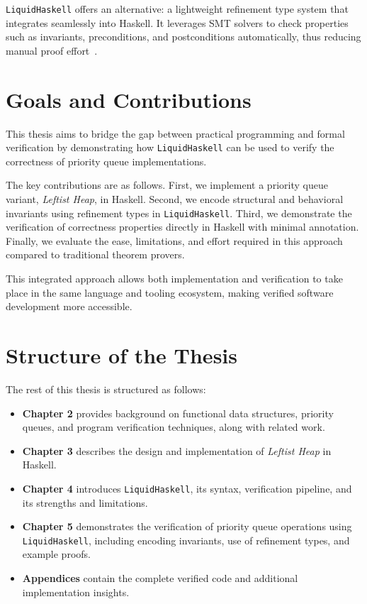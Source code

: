 \texttt{LiquidHaskell} offers an alternative: a lightweight refinement type
system that integrates seamlessly into Haskell.
It leverages SMT solvers to check properties such as invariants, preconditions, and postconditions
automatically, thus reducing manual proof effort~\cite{vazou2018}.

\section{Goals and Contributions}
This thesis aims to bridge the gap between practical programming and formal
verification by demonstrating how \texttt{LiquidHaskell} can be used to verify
the correctness of priority queue implementations.


The key contributions are as follows.
First, we implement a priority queue variant, \emph{Leftist Heap}, in Haskell.
Second, we encode structural and behavioral invariants using refinement types in \texttt{LiquidHaskell}.
Third, we demonstrate the verification of correctness properties directly in Haskell with minimal annotation.
Finally, we evaluate the ease, limitations, and effort required in this approach compared to traditional theorem provers.

This integrated approach allows both implementation and verification to take
place in the same language and tooling ecosystem, making verified software
development more accessible.

\section{Structure of the Thesis}
The rest of this thesis is structured as follows:
\begin{itemize}
	\item \textbf{Chapter 2} provides background on functional data structures,
	      priority queues, and program verification techniques, along with
	      related work.
	\item \textbf{Chapter 3} describes the design and implementation of \emph{Leftist Heap} in Haskell.
	\item \textbf{Chapter 4} introduces \texttt{LiquidHaskell}, its syntax,
	      verification pipeline, and its strengths and limitations.
	\item \textbf{Chapter 5} demonstrates the verification of priority queue
	      operations using \texttt{LiquidHaskell}, including encoding invariants,
	      use of refinement types, and example proofs.
	\item \textbf{Appendices} contain the complete verified code and additional
	      implementation insights.
\end{itemize}

